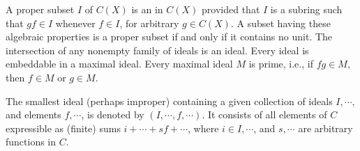 A proper subset $I$ of $C(X)$ is an  in $C(X)$ provided that $I$ is a subring such that $gf \in I$ whenever $f \in I$, for arbitrary $g \in C(X)$. A subset having these algebraic properties is a proper subset if and only if it contains no unit. The intersection of any nonempty family of ideals is an ideal. Every ideal is embeddable in a maximal ideal. Every maximal ideal $M$ is prime, i.e., if $fg \in M$, then $f \in M$ or $g \in M$.

The smallest ideal (perhaps improper) containing a given collection of ideals $I, \cdots$, and elements $f, \cdots$, is denoted by $(I, \cdots, f, \cdots)$. It consists of all elements of $C$ expressible as (finite) sums $i + \cdots + sf + \cdots$, where $i \in I, \cdots$, and $s, \cdots$ are arbitrary functions in $C$.
